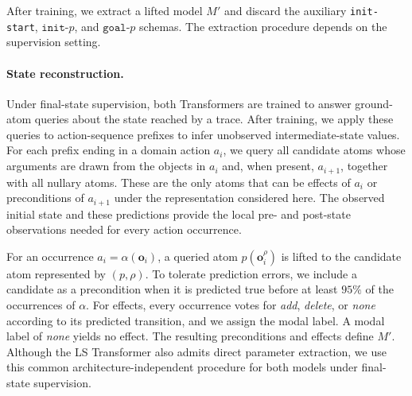 
After training, we extract a lifted \strips model $M'$ and discard the auxiliary \texttt{init-start}, $\texttt{init-}p$, and $\texttt{goal-}p$ schemas.
The extraction procedure depends on the supervision setting.

\paragraph{State reconstruction.}
Under final-state supervision, both Transformers are trained to answer ground-atom queries about the state reached by a trace. After training, we apply these queries to action-sequence prefixes to infer unobserved intermediate-state values. For each prefix ending in a domain action $a_i$, we query all candidate atoms whose arguments are drawn from the objects in $a_i$ and, when present, $a_{i+1}$, together with all nullary atoms. These are the only atoms that can be effects of $a_i$ or preconditions of $a_{i+1}$ under the \strips representation considered here. The observed initial state and these predictions provide the local pre- and
post-state observations needed for every action occurrence.

For an occurrence $a_i=\alpha(\mathbf{o}_i)$, a queried atom
$p(\mathbf{o}_i^\rho)$ is lifted to the candidate atom represented by
$(p,\rho)$.
To tolerate prediction errors, we include a candidate as a precondition when it
is predicted true before at least $95\%$ of the occurrences of $\alpha$.
For effects, every occurrence votes for \emph{add}, \emph{delete}, or
\emph{none} according to its predicted transition, and we assign the modal
label.
A modal label of \emph{none} yields no effect.
The resulting preconditions and effects define $M'$.
Although the LS Transformer also admits direct parameter extraction, we use
this common architecture-independent procedure for both models under
final-state supervision.



